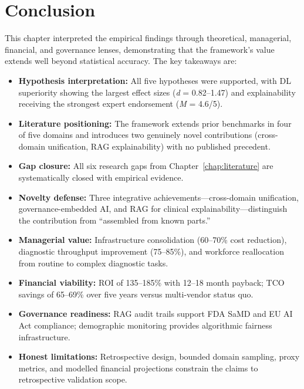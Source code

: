 \section{Conclusion}
\label{sec:ch8_conclusion}

This chapter interpreted the empirical findings through theoretical, managerial, financial, and governance lenses, demonstrating that the framework's value extends well beyond statistical accuracy. The key takeaways are:

\begin{itemize}
    \item \textbf{Hypothesis interpretation:} All five hypotheses were supported, with DL superiority showing the largest effect sizes (\textit{d} = 0.82--1.47) and explainability receiving the strongest expert endorsement (\textit{M} = 4.6/5).

    \item \textbf{Literature positioning:} The framework extends prior benchmarks in four of five domains and introduces two genuinely novel contributions (cross-domain unification, RAG explainability) with no published precedent.

    \item \textbf{Gap closure:} All six research gaps from Chapter~\ref{chap:literature} are systematically closed with empirical evidence.

    \item \textbf{Novelty defense:} Three integrative achievements---cross-domain unification, governance-embedded AI, and RAG for clinical explainability---distinguish the contribution from ``assembled from known parts.''

    \item \textbf{Managerial value:} Infrastructure consolidation (60--70\% cost reduction), diagnostic throughput improvement (75--85\%), and workforce reallocation from routine to complex diagnostic tasks.

    \item \textbf{Financial viability:} ROI of 135--185\% with 12--18 month payback; TCO savings of 65--69\% over five years versus multi-vendor status quo.

    \item \textbf{Governance readiness:} RAG audit trails support FDA SaMD and EU AI Act compliance; demographic monitoring provides algorithmic fairness infrastructure.

    \item \textbf{Honest limitations:} Retrospective design, bounded domain sampling, proxy metrics, and modelled financial projections constrain the claims to retrospective validation scope.
\end{itemize}

